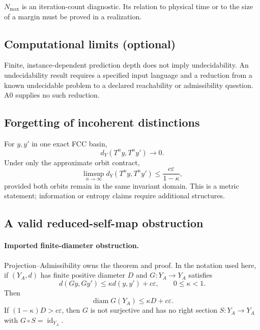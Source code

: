 \documentclass[11pt]{article}
\theoremstyle{plain}
\theoremstyle{plain}
\begin{document}
\begin{remark}
$N_{\max}$ is an iteration-count diagnostic.  Its relation to physical time
or to the size of a margin must be proved in a realization.
\end{remark}
\subsection{Computational limits (optional)}

\begin{remark}
Finite, instance-dependent prediction depth does not imply undecidability.
An undecidability result requires a specified input language and a reduction
from a known undecidable problem to a declared reachability or admissibility
question.  A0 supplies no such reduction.
\end{remark}

\subsection{Forgetting of incoherent distinctions}

\begin{corollary}
For $y,y'$ in one exact FCC basin,
\[
d_Y(T^ny,T^ny')\longrightarrow0.
\]
Under only the approximate orbit contract,
\[
\limsup_{n\to\infty}d_Y(T^ny,T^ny')
\le \frac{c\varepsilon}{1-\kappa},
\]
provided both orbits remain in the same invariant domain.  This is a metric
statement; information or entropy claims require additional structures.
\end{corollary}

\subsection{A valid reduced-self-map obstruction}

\paragraph{Imported finite-diameter obstruction.}
Projection--Admissibility owns the theorem and proof.  In the notation used
here, if $(Y_A,d)$ has finite positive diameter $D$ and
$G:Y_A\to Y_A$ satisfies
\[
d(Gy,Gy')\le\kappa d(y,y')+c\varepsilon,
\qquad0\le\kappa<1.
\]
Then
\[
\operatorname{diam}G(Y_A)\le\kappa D+c\varepsilon.
\]
If $(1-\kappa)D>c\varepsilon$, then $G$ is not surjective and has no
right section $S:Y_A\to Y_A$ with
$G\circ S=\operatorname{id}_{Y_A}$.
\end{document}
